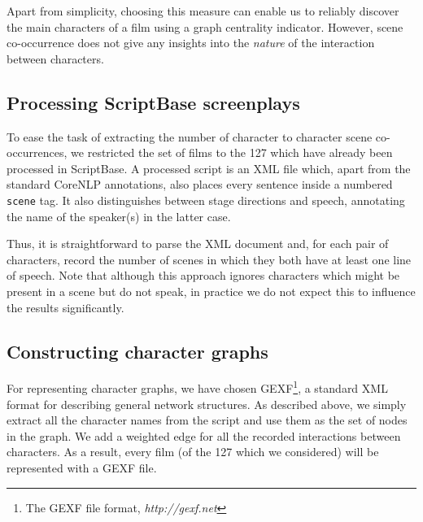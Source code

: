 \documentclass[bsc,frontabs,singlespacing,parskip]{infthesis} %
\begin{document}
Apart from simplicity, choosing this measure can enable us to reliably discover the main characters of a film using a graph centrality indicator. However, scene co-occurrence does not give any insights into the \textit{nature} of the interaction between characters.

\subsection{Processing ScriptBase screenplays}
To ease the task of extracting the number of character to character scene co-occurrences, we restricted the set of films to the 127 which have already been processed in ScriptBase. A processed script is an XML file which, apart from the standard CoreNLP annotations, also places every sentence inside a numbered \texttt{scene} tag. It also distinguishes between stage directions and speech, annotating the name of the speaker(s) in the latter case.

Thus, it is straightforward to parse the XML document and, for each pair of characters, record the number of scenes in which they both have at least one line of speech. Note that although this approach ignores characters which might be present in a scene but do not speak, in practice we do not expect this to influence the results significantly.

\subsection{Constructing character graphs}
For representing character graphs, we have chosen GEXF\footnote{The GEXF file format, \textit{http://gexf.net}}, a standard XML format for describing general network structures. As described above, we simply extract all the character names from the script and use them as the set of nodes in the graph. We add a weighted edge for all the recorded interactions between characters. As a result, every film (of the 127 which we considered) will be represented with a GEXF file.
\end{document}
